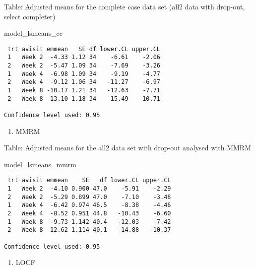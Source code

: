 \documentclass[
  letterpaper,
  DIV=11,
  numbers=noendperiod]{scrreprt}
\newenvironment{Shaded}{\begin{snugshade}}{\end{snugshade}}
\newcommand{\NormalTok}[1]{\textcolor[rgb]{0.00,0.23,0.31}{#1}}
\providecommand{\tightlist}{%
  \setlength{\itemsep}{0pt}\setlength{\parskip}{0pt}}\usepackage{longtable,booktabs,array}
\begin{document}
Table: Adjusted means for the complete case data set (all2 data with
drop-out, select completer)

\begin{Shaded}
\begin{Highlighting}[]
\NormalTok{model\_lsmeans\_cc}
\end{Highlighting}
\end{Shaded}

\begin{verbatim}
 trt avisit emmean   SE df lower.CL upper.CL
 1   Week 2  -4.33 1.12 34    -6.61    -2.06
 2   Week 2  -5.47 1.09 34    -7.69    -3.26
 1   Week 4  -6.98 1.09 34    -9.19    -4.77
 2   Week 4  -9.12 1.06 34   -11.27    -6.97
 1   Week 8 -10.17 1.21 34   -12.63    -7.71
 2   Week 8 -13.10 1.18 34   -15.49   -10.71

Confidence level used: 0.95 
\end{verbatim}

\begin{enumerate}
\def\labelenumi{\arabic{enumi}.}
\setcounter{enumi}{1}
\tightlist
\item
  MMRM
\end{enumerate}

Table: Adjusted means for the all2 data set with drop-out analysed with
MMRM

\begin{Shaded}
\begin{Highlighting}[]
\NormalTok{model\_lsmeans\_mmrm}
\end{Highlighting}
\end{Shaded}

\begin{verbatim}
 trt avisit emmean    SE   df lower.CL upper.CL
 1   Week 2  -4.10 0.900 47.0    -5.91    -2.29
 2   Week 2  -5.29 0.899 47.0    -7.10    -3.48
 1   Week 4  -6.42 0.974 46.5    -8.38    -4.46
 2   Week 4  -8.52 0.951 44.8   -10.43    -6.60
 1   Week 8  -9.73 1.142 40.4   -12.03    -7.42
 2   Week 8 -12.62 1.114 40.1   -14.88   -10.37

Confidence level used: 0.95 
\end{verbatim}

\begin{enumerate}
\def\labelenumi{\arabic{enumi}.}
\setcounter{enumi}{2}
\tightlist
\item
  LOCF
\end{enumerate}
\end{document}
